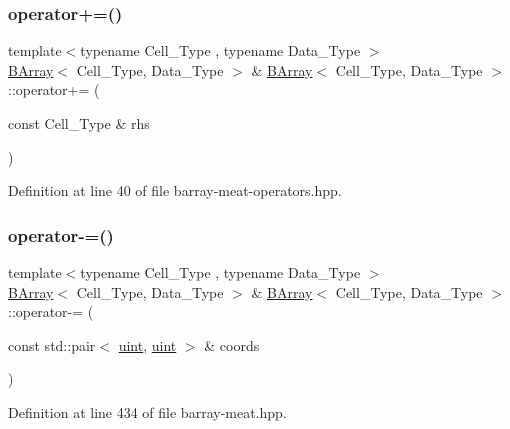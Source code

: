 \subsubsection{\texorpdfstring{operator+=()}{operator+=()}\hspace{0.1cm}{\footnotesize\ttfamily [3/3]}}
{\footnotesize\ttfamily template$<$typename Cell\+\_\+\+Type , typename Data\+\_\+\+Type $>$ \\
\hyperlink{class_b_array}{B\+Array}$<$ Cell\+\_\+\+Type, Data\+\_\+\+Type $>$ \& \hyperlink{class_b_array}{B\+Array}$<$ Cell\+\_\+\+Type, Data\+\_\+\+Type $>$\+::operator+= (\begin{DoxyParamCaption}\item[{const Cell\+\_\+\+Type \&}]{rhs }\end{DoxyParamCaption})\hspace{0.3cm}{\ttfamily [inline]}}



Definition at line 40 of file barray-\/meat-\/operators.\+hpp.

\mbox{\label{class_b_array_ae5dc994ddca6944654e05bf813a8b402}} 
\subsubsection{\texorpdfstring{operator-\/=()}{operator-=()}\hspace{0.1cm}{\footnotesize\ttfamily [1/3]}}
{\footnotesize\ttfamily template$<$typename Cell\+\_\+\+Type , typename Data\+\_\+\+Type $>$ \\
\hyperlink{class_b_array}{B\+Array}$<$ Cell\+\_\+\+Type, Data\+\_\+\+Type $>$ \& \hyperlink{class_b_array}{B\+Array}$<$ Cell\+\_\+\+Type, Data\+\_\+\+Type $>$\+::operator-\/= (\begin{DoxyParamCaption}\item[{const std\+::pair$<$ \hyperlink{typedefs_8hpp_a91ad9478d81a7aaf2593e8d9c3d06a14}{uint}, \hyperlink{typedefs_8hpp_a91ad9478d81a7aaf2593e8d9c3d06a14}{uint} $>$ \&}]{coords }\end{DoxyParamCaption})\hspace{0.3cm}{\ttfamily [inline]}}



Definition at line 434 of file barray-\/meat.\+hpp.

\mbox{\label{class_b_array_a2583fb2b69c1f79ea420b88e981deafa}} 
